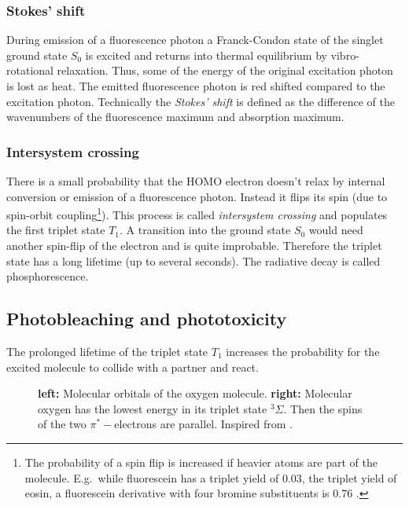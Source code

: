 \subsubsection{Stokes' shift}
During emission of a fluorescence photon a Franck-Condon state of the  
singlet ground state $S_0$ is excited and returns into thermal
equilibrium by vibro-rotational relaxation. Thus, some of the energy
of the original excitation photon is lost as heat. The emitted
fluorescence photon is red shifted compared to the excitation
photon. Technically the \emph{Stokes' shift} is defined as the
difference of the wavenumbers of the fluorescence maximum and
absorption maximum.


\subsubsection{Intersystem crossing}
There is a small probability that the HOMO electron doesn't relax by   
internal conversion or emission of a fluorescence photon. Instead it
flips its spin (due to spin-orbit coupling\footnote{The probability of
  a spin flip is increased if heavier atoms are part of the
  molecule. E.g.\ while fluorescein has a triplet yield of 0.03, the
  triplet yield of eosin, a fluorescein derivative with four bromine
  substituents is 0.76 \citep[p.~37]{Sauer2011}.}). This process is
called \emph{intersystem crossing} and populates the first triplet
state $T_1$. A transition into the ground state $S_0$ would need
another spin-flip of the electron and is quite improbable. Therefore
the triplet state has a long lifetime (up to several seconds). The
radiative decay is called phosphorescence.
  

\subsection{Photobleaching and phototoxicity}
The prolonged lifetime of the triplet state $T_1$ increases the      
probability for the excited molecule to collide with a partner and
react.

\begin{figure}[!hbt]
  \centering
%  
  \caption{{\bf left:} Molecular orbitals of the oxygen molecule. {\bf
      right:} Molecular oxygen has the lowest energy in its triplet
    state ${}^3\Sigma$. Then the spins of the two $\pi^*-$electrons
    are parallel. Inspired from \citet{Linde2011a}.}
  \label{fig:oxygen}
\end{figure}


